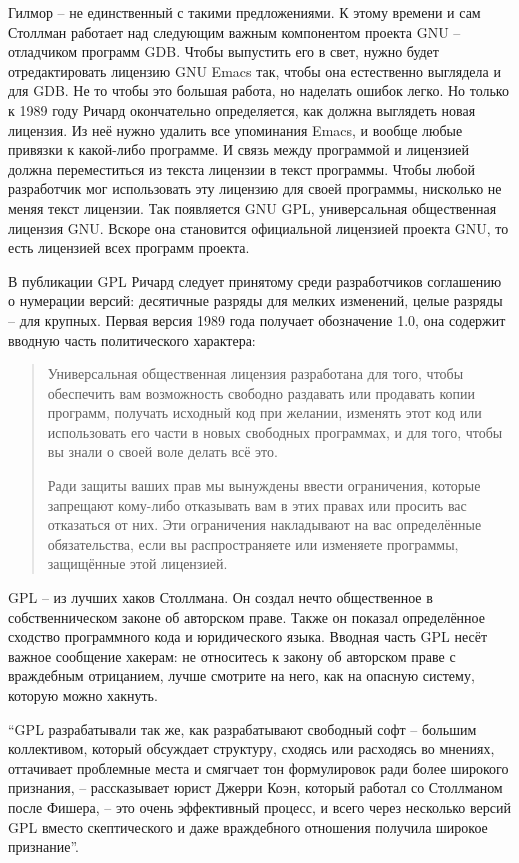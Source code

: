 Гилмор -- не единственный с такими предложениями. К этому времени и сам Столлман работает над следующим важным компонентом проекта GNU -- отладчиком программ GDB. Чтобы выпустить его в свет, нужно будет отредактировать лицензию GNU Emacs так, чтобы она естественно выглядела и для GDB. Не то чтобы это большая работа, но наделать ошибок легко. Но только к 1989 году Ричард окончательно определяется, как должна выглядеть новая лицензия. Из неё нужно удалить все упоминания Emacs, и вообще любые привязки к какой-либо программе. И связь между программой и лицензией должна переместиться из текста лицензии в текст программы. Чтобы любой разработчик мог использовать эту лицензию для своей программы, нисколько не меняя текст лицензии. Так появляется GNU GPL, универсальная общественная лицензия GNU. Вскоре она становится официальной лицензией проекта GNU, то есть лицензией всех программ проекта.

В публикации GPL Ричард следует принятому среди разработчиков соглашению о нумерации версий: десятичные разряды для мелких изменений, целые разряды -- для крупных. Первая версия 1989 года получает обозначение 1.0, она содержит вводную часть политического характера:

\begin{quote}
Универсальная общественная лицензия разработана для того, чтобы обеспечить вам возможность свободно раздавать или продавать копии программ, получать исходный код при желании, изменять этот код или использовать его части в новых свободных программах, и для того, чтобы вы знали о своей воле делать всё это.

Ради защиты ваших прав мы вынуждены ввести ограничения, которые запрещают кому-либо отказывать вам в этих правах или просить вас отказаться от них. Эти ограничения накладывают на вас определённые обязательства, если вы распространяете или изменяете программы, защищённые этой лицензией.
\end{quote}

GPL -- из лучших хаков Столлмана. Он создал нечто общественное в собственническом законе об авторском праве. Также он показал определённое сходство программного кода и юридического языка. Вводная часть GPL несёт важное сообщение хакерам: не относитесь к закону об авторском праве с враждебным отрицанием, лучше смотрите на него, как на опасную систему, которую можно хакнуть.

``GPL разрабатывали так же, как разрабатывают свободный софт -- большим коллективом, который обсуждает структуру, сходясь или расходясь во мнениях, оттачивает проблемные места и смягчает тон формулировок ради более широкого признания, -- рассказывает юрист Джерри Коэн, который работал со Столлманом после Фишера, -- это очень эффективный процесс, и всего через несколько версий GPL вместо скептического и даже враждебного отношения получила широкое признание''.

